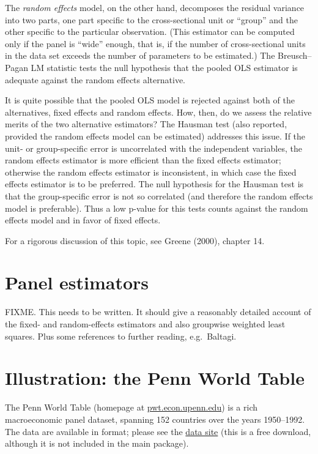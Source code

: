 The \emph{random effects} model, on the other hand, decomposes the
residual variance into two parts, one part specific to the
cross-sectional unit or ``group'' and the other specific to the
particular observation.  (This estimator can be computed only if the
panel is ``wide'' enough, that is, if the number of cross-sectional
units in the data set exceeds the number of parameters to be
estimated.)  The Breusch--Pagan LM statistic tests the null hypothesis
that the pooled OLS estimator is adequate against the random
effects alternative.

It is quite possible that the pooled OLS model is rejected against
both of the alternatives, fixed effects and random effects. How, then,
do we assess the relative merits of the two alternative estimators?
The Hausman test (also reported, provided the random effects model can
be estimated) addresses this issue.  If the unit- or group-specific
error is uncorrelated with the independent variables, the random
effects estimator is more efficient than the fixed effects estimator;
otherwise the random effects estimator is inconsistent, in which case
the fixed effects estimator is to be preferred.  The null hypothesis
for the Hausman test is that the group-specific error is not so
correlated (and therefore the random effects model is preferable).
Thus a low p-value for this tests counts against the random effects
model and in favor of fixed effects.

For a rigorous discussion of this topic, see Greene (2000), chapter
14.

\section{Panel estimators}
\label{panel-est}

FIXME.  This needs to be written.  It should give a reasonably
detailed account of the fixed- and random-effects estimators and also
groupwise weighted least squares.  Plus some references to further
reading, e.g.\ Baltagi.


\section{Illustration: the Penn World Table}
\label{PWT}

The Penn World Table (homepage at
\href{http://pwt.econ.upenn.edu/}{pwt.econ.upenn.edu}) is a rich
macroeconomic panel dataset, spanning 152 countries over the years
1950--1992.  The data are available in  format; please see
the 
\href{http://gretl.sourceforge.net/gretl_data.html}{data site} (this
is a free download, although it is not included in the main
 package).

